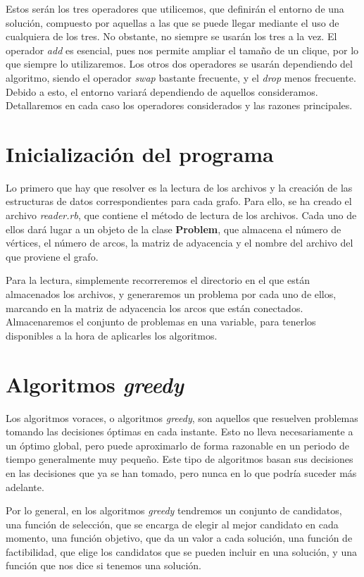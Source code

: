 Estos serán los tres operadores que utilicemos, que definirán el entorno de una solución, compuesto por
aquellas a las que se puede llegar mediante el uso de cualquiera de los tres. No obstante, no siempre se
usarán los tres a la vez. El operador \textit{add} es esencial, pues nos permite ampliar el tamaño de un clique,
por lo que siempre lo utilizaremos. Los otros dos operadores se usarán dependiendo del algoritmo, siendo el operador
\textit{swap} bastante frecuente, y el \textit{drop} menos frecuente. Debido a esto, el entorno variará dependiendo de
aquellos consideramos. Detallaremos en cada caso los operadores considerados y las razones principales.

\section{Inicialización del programa}
Lo primero que hay que resolver es la lectura de los archivos y la creación de las estructuras de datos correspondientes
para cada grafo. Para ello, se ha creado el archivo \textit{reader.rb}, que contiene el método de lectura de los archivos.
Cada uno de ellos dará lugar a un objeto de la clase \textbf{Problem}, que almacena el número de vértices, el número de
arcos, la matriz de adyacencia y el nombre del archivo del que proviene el grafo.

Para la lectura, simplemente recorreremos el directorio en el que están almacenados los archivos, y generaremos un problema
por cada uno de ellos, marcando en la matriz de adyacencia los arcos que están conectados. Almacenaremos el conjunto de problemas
en una variable, para tenerlos disponibles a la hora de aplicarles los algoritmos.

\section{Algoritmos \textit{greedy}}

Los algoritmos voraces, o algoritmos \textit{greedy}, son aquellos que resuelven problemas tomando
las decisiones óptimas en cada instante. Esto no lleva necesariamente a un óptimo global, pero puede
aproximarlo de forma razonable en un periodo de tiempo generalmente muy pequeño. Este tipo de algoritmos
basan sus decisiones en las decisiones que ya se han tomado, pero nunca en lo que podría suceder más
adelante.

Por lo general, en los algoritmos \textit{greedy} tendremos un conjunto de candidatos, una función
de selección, que se encarga de elegir al mejor candidato en cada momento, una función objetivo, que
da un valor a cada solución, una función de factibilidad, que elige los candidatos que se pueden incluir
en una solución, y una función que nos dice si tenemos una solución.


